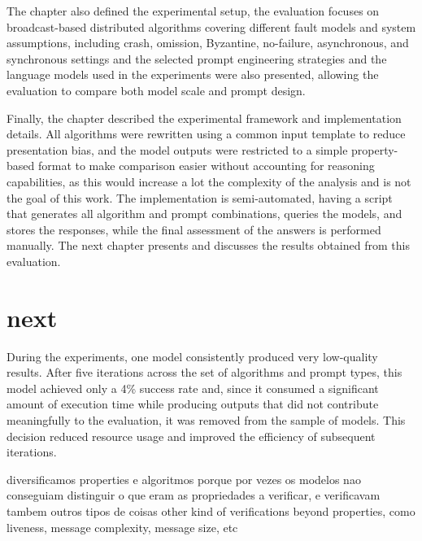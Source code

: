 The chapter also defined the experimental setup, the evaluation focuses on broadcast-based distributed algorithms covering different fault models and system assumptions, including crash, omission, Byzantine, no-failure, asynchronous, and synchronous settings and the selected prompt engineering strategies and the language models used in the experiments were also presented, allowing the evaluation to compare both model scale and prompt design.

Finally, the chapter described the experimental framework and implementation details. All algorithms were rewritten using a common input template to reduce presentation bias, and the model outputs were restricted to a simple property-based format to make comparison easier without accounting for reasoning capabilities, as this would increase a lot the complexity of the analysis and is not the goal of this work. The implementation is semi-automated, having a script that generates all algorithm and prompt combinations, queries the models, and stores the responses, while the final assessment of the answers is performed manually. The next chapter presents and discusses the results obtained from this evaluation.


\section{next}
During the experiments, one model consistently produced very low-quality results. After five iterations across the set of algorithms and prompt types, this model achieved only a 4\% success rate and, since it consumed a significant amount of execution time while producing outputs that did not contribute meaningfully to the evaluation, it was removed from the sample of models. This decision reduced resource usage and improved the efficiency of subsequent iterations.

diversificamos properties e algoritmos porque por vezes os modelos nao conseguiam distinguir o que eram as propriedades a verificar, e verificavam tambem outros tipos de coisas other kind of verifications beyond properties, como liveness, message complexity, message size, etc